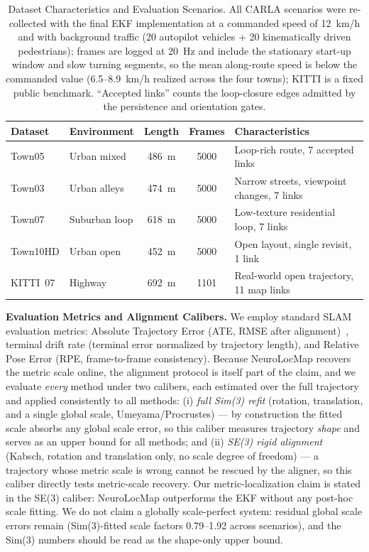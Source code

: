 \begin{table}[!t]
    \centering
    \setlength{\tabcolsep}{2.8pt} %
    \footnotesize
    \caption{Dataset Characteristics and Evaluation Scenarios. All CARLA scenarios were re-collected with the final EKF implementation at a commanded speed of 12~km/h and with background traffic (20 autopilot vehicles + 20 kinematically driven pedestrians); frames are logged at 20~Hz and include the stationary start-up window and slow turning segments, so the mean along-route speed is below the commanded value (6.5--8.9~km/h realized across the four towns); KITTI is a fixed public benchmark. ``Accepted links'' counts the loop-closure edges admitted by the persistence and orientation gates.}
    \label{tab:datasets}
    \begin{tabular}{@{}llccl@{}}
        \toprule
        Dataset  & Environment & Length & Frames & Characteristics                    \\
        \midrule
        Town05   & Urban mixed & 486~m  & 5000   & Loop-rich route, 7 accepted links  \\
        Town03   & Urban alleys& 474~m  & 5000   & Narrow streets, viewpoint changes, 7 links \\
        Town07   & Suburban loop& 618~m & 5000   & Low-texture residential loop, 7 links \\
        Town10HD & Urban open  & 452~m  & 5000   & Open layout, single revisit, 1 link \\
        KITTI~07 & Highway     & 692~m  & 1101   & Real-world open trajectory, 11 map links \\
        \bottomrule
    \end{tabular}
\end{table}

\textbf{Evaluation Metrics and Alignment Calibers.} We employ standard SLAM evaluation metrics: Absolute Trajectory Error (ATE, RMSE after alignment)~\cite{sturm2012benchmark}, terminal drift rate (terminal error normalized by trajectory length), and Relative Pose Error (RPE, frame-to-frame consistency). Because NeuroLocMap recovers the metric scale online, the alignment protocol is itself part of the claim, and we evaluate \emph{every} method under two calibers, each estimated over the full trajectory and applied consistently to all methods: (i) \emph{full Sim(3) refit} (rotation, translation, and a single global scale, Umeyama/Procrustes) --- by construction the fitted scale absorbs any global scale error, so this caliber measures trajectory \emph{shape} and serves as an upper bound for all methods; and (ii) \emph{SE(3) rigid alignment} (Kabsch, rotation and translation only, no scale degree of freedom) --- a trajectory whose metric scale is wrong cannot be rescued by the aligner, so this caliber directly tests metric-scale recovery. Our metric-localization claim is stated in the SE(3) caliber: NeuroLocMap outperforms the EKF without any post-hoc scale fitting. We do not claim a globally scale-perfect system: residual global scale errors remain (Sim(3)-fitted scale factors 0.79--1.92 across scenarios), and the Sim(3) numbers should be read as the shape-only upper bound.

